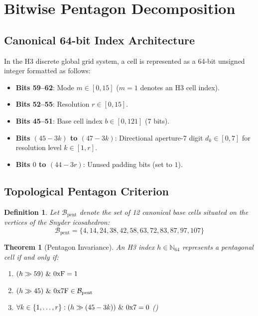 \documentclass[10pt,twocolumn]{article}
\newtheorem{theorem}{Theorem}
\newtheorem{definition}{Definition}
\begin{document}
\section{Bitwise Pentagon Decomposition}

\subsection{Canonical 64-bit Index Architecture}
In the H3 discrete global grid system, a cell is represented as a 64-bit unsigned integer formatted as follows:
\begin{itemize}
    \item \textbf{Bits 59--62}: Mode $m \in [0, 15]$ ($m = 1$ denotes an H3 cell index).
    \item \textbf{Bits 52--55}: Resolution $r \in [0, 15]$.
    \item \textbf{Bits 45--51}: Base cell index $b \in [0, 121]$ (7 bits).
    \item \textbf{Bits $(45 - 3k)$ to $(47 - 3k)$}: Directional aperture-7 digit $d_k \in [0, 7]$ for resolution level $k \in [1, r]$.
    \item \textbf{Bits $0$ to $(44 - 3r)$}: Unused padding bits (set to $1$).
\end{itemize}

\subsection{Topological Pentagon Criterion}

\begin{definition}
Let $\mathcal{B}_{\text{pent}}$ denote the set of 12 canonical base cells situated on the vertices of the Snyder icosahedron:
\begin{equation}
\mathcal{B}_{\text{pent}} = \{4, 14, 24, 38, 42, 58, 63, 72, 83, 87, 97, 107\}
\end{equation}
\end{definition}

\begin{theorem}[Pentagon Invariance]
An H3 index $h \in \mathbb{N}_{64}$ represents a pentagonal cell if and only if:
\begin{enumerate}
    \item $(h \gg 59) \ \& \ 0\text{\upshape xF} = 1$
    \item $(h \gg 45) \ \& \ 0\text{\upshape x7F} \in \mathcal{B}_{\text{pent}}$
    \item $\forall k \in \{1, \dots, r\}: (h \gg (45 - 3k)) \ \& \ 0\text{\upshape x7} = 0$ ()
\end{enumerate}
\end{theorem}
\end{document}
